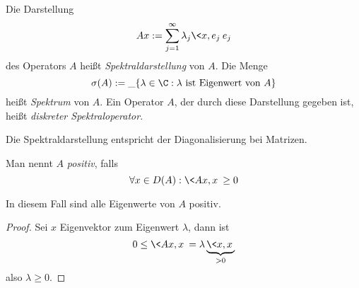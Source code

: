 \documentclass{mycourse}
\begin{document}
\begin{df} \label{1.20}
	Die Darstellung 
	\[
		Ax := \sum_{j=1}^\infty \lambda_j \<x,e_j\> e_j
	\]
	des Operators $A$ heißt \emph{Spektraldarstellung} von $A$.
	Die Menge
	\[
		\sigma(A) := \_{\{\lambda \in \C : \lambda \text{ ist Eigenwert von $A$} \}}
	\]
	heißt \emph{Spektrum} von $A$.
	Ein Operator $A$, der durch diese Darstellung gegeben ist, heißt \emph{diskreter Spektraloperator}.
	\begin{note}
		Die Spektraldarstellung entspricht der Diagonalisierung bei Matrizen.
	\end{note}
\end{df}

\begin{df*}
	Man nennt $A$ \emph{positiv}, falls
	\[
		\forall x \in D(A) : \<Ax,x\> \ge 0
	\]
	\begin{note}
		In diesem Fall sind alle Eigenwerte von $A$ positiv.
		\begin{proof}
			Sei $x$ Eigenvektor zum Eigenwert $\lambda$, dann ist
			\[
				0 \le \<Ax,x\> 
				= \lambda \underbrace{\<x,x\>}_{>0}
			\]
			also $\lambda \ge 0$.
		\end{proof}
	\end{note}
\end{df*}
\end{document}
